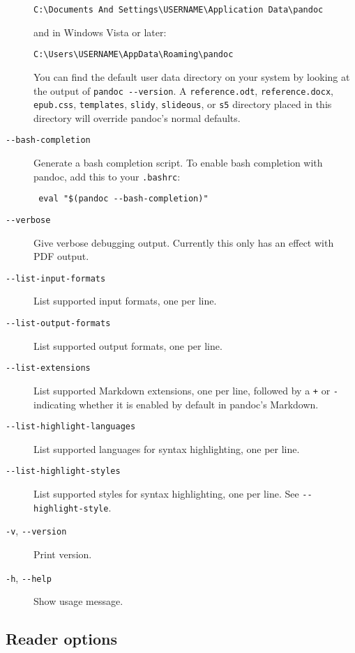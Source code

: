 \documentclass[]{article}
\begin{document}
\begin{description}
\begin{verbatim}
C:\Documents And Settings\USERNAME\Application Data\pandoc
\end{verbatim}

and in Windows Vista or later:

\begin{verbatim}
C:\Users\USERNAME\AppData\Roaming\pandoc
\end{verbatim}

You can find the default user data directory on your system by looking
at the output of \texttt{pandoc\ -\/-version}. A \texttt{reference.odt},
\texttt{reference.docx}, \texttt{epub.css}, \texttt{templates},
\texttt{slidy}, \texttt{slideous}, or \texttt{s5} directory placed in
this directory will override pandoc's normal defaults.
\item[\texttt{-\/-bash-completion}]
Generate a bash completion script. To enable bash completion with
pandoc, add this to your \texttt{.bashrc}:

\begin{verbatim}
 eval "$(pandoc --bash-completion)"
\end{verbatim}
\item[\texttt{-\/-verbose}]
Give verbose debugging output. Currently this only has an effect with
PDF output.
\item[\texttt{-\/-list-input-formats}]
List supported input formats, one per line.
\item[\texttt{-\/-list-output-formats}]
List supported output formats, one per line.
\item[\texttt{-\/-list-extensions}]
List supported Markdown extensions, one per line, followed by a
\texttt{+} or \texttt{-} indicating whether it is enabled by default in
pandoc's Markdown.
\item[\texttt{-\/-list-highlight-languages}]
List supported languages for syntax highlighting, one per line.
\item[\texttt{-\/-list-highlight-styles}]
List supported styles for syntax highlighting, one per line. See
\texttt{-\/-highlight-style}.
\item[\texttt{-v}, \texttt{-\/-version}]
Print version.
\item[\texttt{-h}, \texttt{-\/-help}]
Show usage message.
\end{description}

\subsection{Reader options}\label{reader-options}
\end{document}
